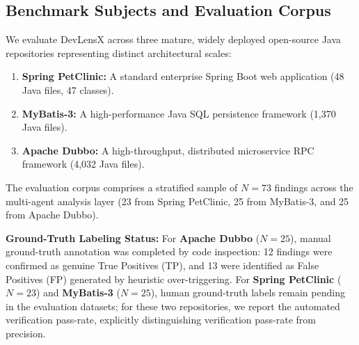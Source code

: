 \documentclass[runningheads]{llncs}
\begin{document}
\subsection{Benchmark Subjects and Evaluation Corpus}
We evaluate DevLensX across three mature, widely deployed open-source Java repositories representing distinct architectural scales:
\begin{enumerate}
    \item \textbf{Spring PetClinic:} A standard enterprise Spring Boot web application (48 Java files, 47 classes).
    \item \textbf{MyBatis-3:} A high-performance Java SQL persistence framework (1,370 Java files).
    \item \textbf{Apache Dubbo:} A high-throughput, distributed microservice RPC framework (4,032 Java files).
\end{enumerate}

The evaluation corpus comprises a stratified sample of $N = 73$ findings across the multi-agent analysis layer (23 from Spring PetClinic, 25 from MyBatis-3, and 25 from Apache Dubbo). 

\textbf{Ground-Truth Labeling Status:} For \textbf{Apache Dubbo} ($N=25$), manual ground-truth annotation was completed by code inspection: 12 findings were confirmed as genuine True Positives (TP), and 13 were identified as False Positives (FP) generated by heuristic over-triggering. For \textbf{Spring PetClinic} ($N=23$) and \textbf{MyBatis-3} ($N=25$), human ground-truth labels remain pending in the evaluation datasets; for these two repositories, we report the automated verification pass-rate, explicitly distinguishing verification pass-rate from precision.

\begin{table}[t]
\centering
\caption{Empirical Evaluation across Benchmark Repositories ($N=73$)}
\label{tab:empirical_eval}
\end{table}
\end{document}
